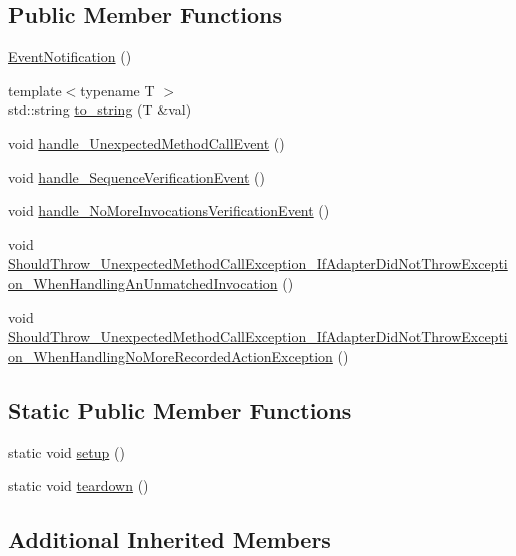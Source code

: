 \subsection*{Public Member Functions}
\begin{DoxyCompactItemize}
\item 
\mbox{\hyperlink{structEventNotification_ac4f9a838399fa6e30e433db0f0226e61}{Event\+Notification}} ()
\item 
{\footnotesize template$<$typename T $>$ }\\std\+::string \mbox{\hyperlink{structEventNotification_a89f133025fca462e6316a6b242b408f6}{to\+\_\+string}} (T \&val)
\item 
void \mbox{\hyperlink{structEventNotification_afb45cbce2d1c34b59ad04f9302679d19}{handle\+\_\+\+Unexpected\+Method\+Call\+Event}} ()
\item 
void \mbox{\hyperlink{structEventNotification_a3e7d8a2962d66c94d52526baa0ce6149}{handle\+\_\+\+Sequence\+Verification\+Event}} ()
\item 
void \mbox{\hyperlink{structEventNotification_a8d485931d956487db46d5212cc52e7df}{handle\+\_\+\+No\+More\+Invocations\+Verification\+Event}} ()
\item 
void \mbox{\hyperlink{structEventNotification_a711304a491858c8659020a3deee21ae2}{Should\+Throw\+\_\+\+Unexpected\+Method\+Call\+Exception\+\_\+\+If\+Adapter\+Did\+Not\+Throw\+Exception\+\_\+\+When\+Handling\+An\+Unmatched\+Invocation}} ()
\item 
void \mbox{\hyperlink{structEventNotification_a6239681a306e7ff7240cd6daf8e39795}{Should\+Throw\+\_\+\+Unexpected\+Method\+Call\+Exception\+\_\+\+If\+Adapter\+Did\+Not\+Throw\+Exception\+\_\+\+When\+Handling\+No\+More\+Recorded\+Action\+Exception}} ()
\end{DoxyCompactItemize}
\subsection*{Static Public Member Functions}
\begin{DoxyCompactItemize}
\item 
static void \mbox{\hyperlink{structEventNotification_adadf027d0551e18d95095b05202e263e}{setup}} ()
\item 
static void \mbox{\hyperlink{structEventNotification_a5e85ce3dd7d7525e6f72d21a584c78bd}{teardown}} ()
\end{DoxyCompactItemize}
\subsection*{Additional Inherited Members}


